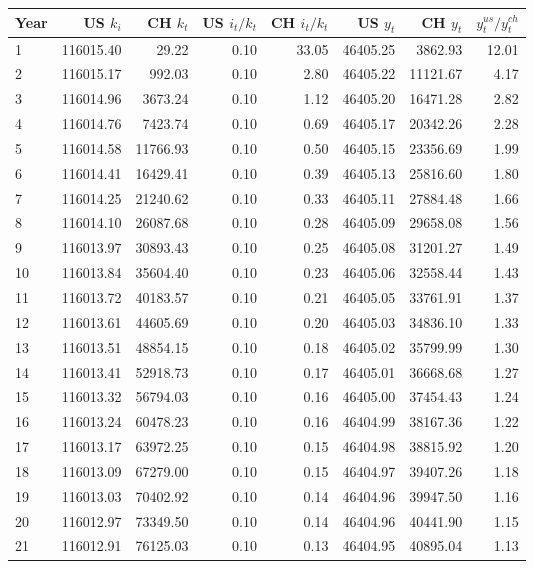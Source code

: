 \documentclass[12pt,letterpaper]{article}
\theoremstyle{definition}
\begin{document}
\begin{table}[p]
\centering
\begin{tabular}{lrrrrrrr}
  \hline
  Year & US $k_i$ & CH $k_t$ & US $i_t/k_t$ & CH $i_t/k_t$ & US $y_t$ & CH $y_t$ & $y^{us}_t / y^{ch}_t$  \\
  \hline
1 & 116015.40 & 29.22 & 0.10 & 33.05 & 46405.25 & 3862.93 & 12.01 \\ 
  2 & 116015.17 & 992.03 & 0.10 & 2.80 & 46405.22 & 11121.67 & 4.17 \\ 
  3 & 116014.96 & 3673.24 & 0.10 & 1.12 & 46405.20 & 16471.28 & 2.82 \\ 
  4 & 116014.76 & 7423.74 & 0.10 & 0.69 & 46405.17 & 20342.26 & 2.28 \\ 
  5 & 116014.58 & 11766.93 & 0.10 & 0.50 & 46405.15 & 23356.69 & 1.99 \\ 
  6 & 116014.41 & 16429.41 & 0.10 & 0.39 & 46405.13 & 25816.60 & 1.80 \\ 
  7 & 116014.25 & 21240.62 & 0.10 & 0.33 & 46405.11 & 27884.48 & 1.66 \\ 
  8 & 116014.10 & 26087.68 & 0.10 & 0.28 & 46405.09 & 29658.08 & 1.56 \\ 
  9 & 116013.97 & 30893.43 & 0.10 & 0.25 & 46405.08 & 31201.27 & 1.49 \\ 
  10 & 116013.84 & 35604.40 & 0.10 & 0.23 & 46405.06 & 32558.44 & 1.43 \\ 
  11 & 116013.72 & 40183.57 & 0.10 & 0.21 & 46405.05 & 33761.91 & 1.37 \\ 
  12 & 116013.61 & 44605.69 & 0.10 & 0.20 & 46405.03 & 34836.10 & 1.33 \\ 
  13 & 116013.51 & 48854.15 & 0.10 & 0.18 & 46405.02 & 35799.99 & 1.30 \\ 
  14 & 116013.41 & 52918.73 & 0.10 & 0.17 & 46405.01 & 36668.68 & 1.27 \\ 
  15 & 116013.32 & 56794.03 & 0.10 & 0.16 & 46405.00 & 37454.43 & 1.24 \\ 
  16 & 116013.24 & 60478.23 & 0.10 & 0.16 & 46404.99 & 38167.36 & 1.22 \\ 
  17 & 116013.17 & 63972.25 & 0.10 & 0.15 & 46404.98 & 38815.92 & 1.20 \\ 
  18 & 116013.09 & 67279.00 & 0.10 & 0.15 & 46404.97 & 39407.26 & 1.18 \\ 
  19 & 116013.03 & 70402.92 & 0.10 & 0.14 & 46404.96 & 39947.50 & 1.16 \\ 
  20 & 116012.97 & 73349.50 & 0.10 & 0.14 & 46404.96 & 40441.90 & 1.15 \\ 
  21 & 116012.91 & 76125.03 & 0.10 & 0.13 & 46404.95 & 40895.04 & 1.13 \\ 

\end{tabular}
\end{table}
\end{document}
